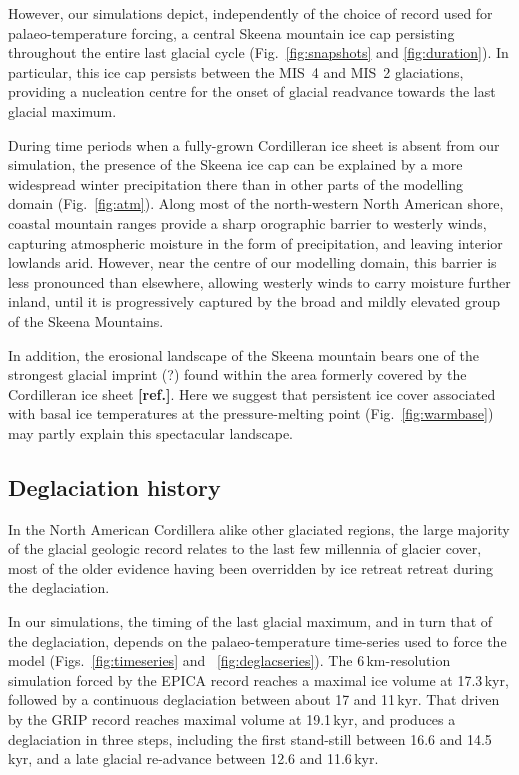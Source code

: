 \documentclass[tc, manuscript]{copernicus}
\newcommand{\aref}[0]{\textbf{[ref.]}}
\begin{document}
However, our simulations depict, independently of the choice of record used for
palaeo-temperature forcing, a central Skeena mountain ice cap persisting
throughout the entire last glacial cycle (Fig.~\ref{fig:snapshots} and
\ref{fig:duration}). In particular, this ice cap persists between the MIS~4
and MIS~2 glaciations, providing a nucleation centre for the onset of glacial
readvance towards the last glacial maximum.

During time periods when a fully-grown Cordilleran ice sheet is absent from our
simulation, the presence of the Skeena ice cap can be explained by a more
widespread winter precipitation there than in other parts of the modelling
domain (Fig.~\ref{fig:atm}). Along most of the north-western North American
shore, coastal mountain ranges provide a sharp orographic barrier to westerly
winds, capturing atmospheric moisture in the form of precipitation, and leaving
interior lowlands arid. However, near the centre of our modelling domain, this
barrier is less pronounced than
elsewhere, allowing westerly winds to carry moisture further inland, until it
is progressively captured by the broad and mildly elevated group of the Skeena
Mountains.

In addition, the erosional landscape of the Skeena mountain bears one of the
strongest glacial imprint (?) found within the area formerly covered by the
Cordilleran ice sheet \aref. Here we suggest that persistent ice cover
associated with basal ice temperatures at the pressure-melting point
(Fig.~\ref{fig:warmbase}) may partly explain this spectacular landscape.

\subsection{Deglaciation history}

In the North American Cordillera alike other glaciated regions, the large
majority of the glacial geologic record relates to the last few millennia of
glacier cover, most of the older evidence having been overridden by ice retreat
retreat during the deglaciation.

In our simulations, the timing of the last glacial maximum, and in turn that of
the deglaciation, depends on the palaeo-temperature time-series used to force
the model (Figs.~\ref{fig:timeseries} and ~\ref{fig:deglacseries}). The
6\,km-resolution simulation forced by the EPICA record reaches a maximal
ice volume at 17.3\,kyr, followed by a continuous deglaciation between
about 17 and 11\,kyr. That driven by the GRIP record reaches maximal
volume at 19.1\,kyr, and produces a deglaciation in three steps,
including the first stand-still between 16.6 and 14.5\,kyr, and a late
glacial re-advance between 12.6 and 11.6\,kyr.
\end{document}
